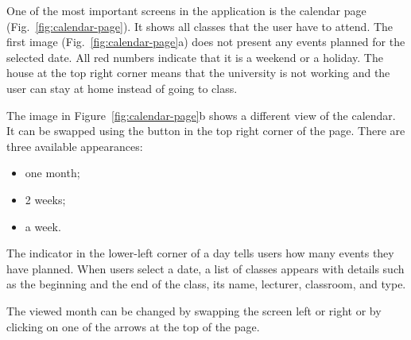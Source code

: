 One of the most important screens in the application is the calendar page (Fig.~\ref{fig:calendar-page}). It shows all classes that the user have to attend. The first image (Fig.~\ref{fig:calendar-page}a) does not present any events planned for the selected date. All red numbers indicate that it is a weekend or a holiday. The house at the top right corner means that the university is not working and the user can stay at home instead of going to class.

The image in Figure~\ref{fig:calendar-page}b shows a different view of the calendar. It can be swapped using the button in the top right corner of the page. There are three available appearances:
\begin{itemize}
    \item one month;
    \item 2 weeks;
    \item a week.
\end{itemize}
 
The indicator in the lower-left corner of a day tells users how many events they have planned. When users select a date, a list of classes appears with details such as the beginning and the end of the class, its name, lecturer, classroom, and type.

The viewed month can be changed by swapping the screen left or right or by clicking on one of the arrows at the top of the page.

